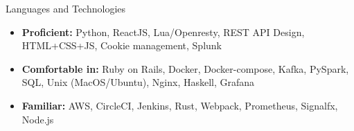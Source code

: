 \documentclass[]{mcdowellcv}
\begin{document}
	\begin{cvsection}{Languages and Technologies}
		\begin{cvsubsection}{}{}{}	
			\begin{itemize}
				\item \textbf{Proficient:} Python, ReactJS, Lua/Openresty, REST API Design, HTML+CSS+JS, Cookie management, Splunk
				\item \textbf{Comfortable in:} Ruby on Rails, Docker, Docker-compose, Kafka, PySpark, SQL, Unix (MacOS/Ubuntu), Nginx, Haskell, Grafana
				\item \textbf{Familiar:} AWS, CircleCI, Jenkins, Rust, Webpack, Prometheus, Signalfx, Node.js
			\end{itemize}
		\end{cvsubsection}
	\end{cvsection}
\end{document}

